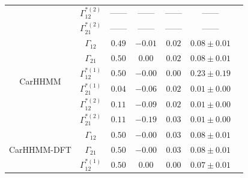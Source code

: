 \documentclass[12pt]{TD-CJS}
\begin{document}
{\begin{tabular}{ccccccc}
                             & $\Gamma^{*(2)}_{12}$          & ------                         & ------                   & ------                           & ------                                      \\
                             & $\Gamma^{*(2)}_{21}$          & ------                         & ------                   & ------                           & ------                                      \\ \hline
\multirow{6}{*}{CarHHMM}     & $\Gamma_{12}$                 & $0.49$                         & $-0.01$                   & $0.02$                           & $0.08 \pm 0.01$                             \\
                             & $\Gamma_{21}$                 & $0.50$                         & $0.00$                   & $0.02$                           & $0.08 \pm 0.01$                             \\
                             & $\Gamma^{*(1)}_{12}$          & $0.50$                         & $-0.00$                   & $0.00$                           & $0.23 \pm 0.19$                             \\
                             & $\Gamma^{*(1)}_{21}$          & $0.04$                         & $-0.06$                   & $0.02$                           & $0.01 \pm 0.00$                             \\
                             & $\Gamma^{*(2)}_{12}$          & $0.11$                         & $-0.09$                   & $0.02$                           & $0.01 \pm 0.00$                             \\
                             & $\Gamma^{*(2)}_{21}$          & $0.11$                         & $-0.19$                   & $0.03$                           & $0.01 \pm 0.00$                             \\ \hline
\multirow{6}{*}{CarHHMM-DFT} & $\Gamma_{12}$                 & $0.50$                         & $-0.00$                   & $0.03$                           & $0.08 \pm 0.01$                             \\
                             & $\Gamma_{21}$                 & $0.50$                         & $-0.00$                   & $0.03$                           & $0.08 \pm 0.01$                             \\
                             & $\Gamma^{*(1)}_{12}$          & $0.50$                         & $0.00$                   & $0.00$                           & $0.07 \pm 0.01$                             \\

\end{tabular}}
\end{document}
